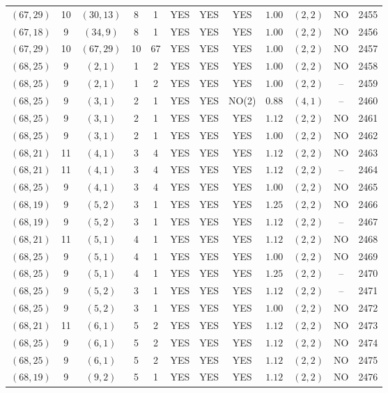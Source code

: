 \begin{longtable}{|c|c|c|c|c|c|c|c|c|c|c|c|}
$(67,29)$ & 10 & $(30,13)$ & 8 & 1 & YES & YES & YES & $1.00$ & $(2,2)$ & NO & 2455\\
$(67,18)$ & 9 & $(34,9)$ & 8 & 1 & YES & YES & YES & $1.00$ & $(2,2)$ & NO & 2456\\
$(67,29)$ & 10 & $(67,29)$ & 10 & 67 & YES & YES & YES & $1.00$ & $(2,2)$ & NO & 2457\\
$(68,25)$ & 9 & $(2,1)$ & 1 & 2 & YES & YES & YES & $1.00$ & $(2,2)$ & NO & 2458\\
$(68,25)$ & 9 & $(2,1)$ & 1 & 2 & YES & YES & YES & $1.00$ & $(2,2)$ & -- & 2459\\
$(68,25)$ & 9 & $(3,1)$ & 2 & 1 & YES & YES & NO(2) & $0.88$ & $(4,1)$ & -- & 2460\\
$(68,25)$ & 9 & $(3,1)$ & 2 & 1 & YES & YES & YES & $1.12$ & $(2,2)$ & NO & 2461\\
$(68,25)$ & 9 & $(3,1)$ & 2 & 1 & YES & YES & YES & $1.00$ & $(2,2)$ & NO & 2462\\
$(68,21)$ & 11 & $(4,1)$ & 3 & 4 & YES & YES & YES & $1.12$ & $(2,2)$ & NO & 2463\\
$(68,21)$ & 11 & $(4,1)$ & 3 & 4 & YES & YES & YES & $1.12$ & $(2,2)$ & -- & 2464\\
$(68,25)$ & 9 & $(4,1)$ & 3 & 4 & YES & YES & YES & $1.00$ & $(2,2)$ & NO & 2465\\
$(68,19)$ & 9 & $(5,2)$ & 3 & 1 & YES & YES & YES & $1.25$ & $(2,2)$ & NO & 2466\\
$(68,19)$ & 9 & $(5,2)$ & 3 & 1 & YES & YES & YES & $1.12$ & $(2,2)$ & -- & 2467\\
$(68,21)$ & 11 & $(5,1)$ & 4 & 1 & YES & YES & YES & $1.12$ & $(2,2)$ & NO & 2468\\
$(68,25)$ & 9 & $(5,1)$ & 4 & 1 & YES & YES & YES & $1.00$ & $(2,2)$ & NO & 2469\\
$(68,25)$ & 9 & $(5,1)$ & 4 & 1 & YES & YES & YES & $1.25$ & $(2,2)$ & -- & 2470\\
$(68,25)$ & 9 & $(5,2)$ & 3 & 1 & YES & YES & YES & $1.12$ & $(2,2)$ & -- & 2471\\
$(68,25)$ & 9 & $(5,2)$ & 3 & 1 & YES & YES & YES & $1.00$ & $(2,2)$ & NO & 2472\\
$(68,21)$ & 11 & $(6,1)$ & 5 & 2 & YES & YES & YES & $1.12$ & $(2,2)$ & NO & 2473\\
$(68,25)$ & 9 & $(6,1)$ & 5 & 2 & YES & YES & YES & $1.12$ & $(2,2)$ & NO & 2474\\
$(68,25)$ & 9 & $(6,1)$ & 5 & 2 & YES & YES & YES & $1.12$ & $(2,2)$ & NO & 2475\\
$(68,19)$ & 9 & $(9,2)$ & 5 & 1 & YES & YES & YES & $1.12$ & $(2,2)$ & NO & 2476\\

\end{longtable}
